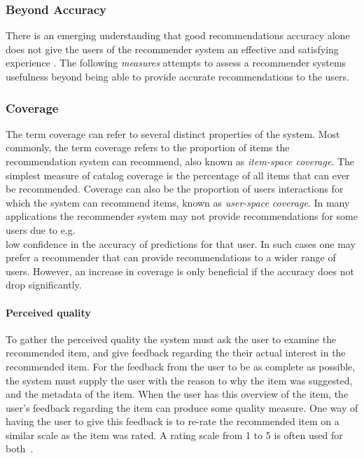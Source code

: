 \subsubsection{Beyond Accuracy}
There is an emerging understanding that good recommendations accuracy alone does not give the users of the recommender system an effective and satisfying experience \cite{Herlocker2004}. The following \emph{measures} attempts to assess a recommender systems usefulness beyond being able to provide accurate recommendations to the users.

\subsubsection{Coverage}
The term coverage can refer to several distinct properties of the system. Most
commonly, the term coverage refers to the proportion of items the
recommendation system can recommend, also known as \emph{item-space coverage}.
The simplest measure of catalog coverage is the percentage of all items that
can ever be recommended. Coverage can also be the proportion of users
interactions for which the system can recommend items, known as
\emph{user-space coverage}. In many applications the recommender system may not
provide recommendations for some users due to e.g.\\ low confidence in the
accuracy of predictions for that user. In such cases one may prefer a
recommender that can provide recommendations to a wider range of users. However, an increase in coverage is only beneficial if the accuracy does not drop significantly.

\paragraph{Perceived quality}
To gather the perceived quality the system must ask the user to examine the recommended item, and give feedback regarding the their actual interest in the recommended item.
For the feedback from the user to be as complete as possible, the system must supply the user with the reason to why the item was suggested, and the metadata of the item.
When the user has this overview of the item, the user's feedback regarding the item can produce some quality measure.
One  way of having the user to give this feedback is to re-rate the recommended item on a similar scale as the item was rated.
A rating scale from 1 to 5 is often used for both~\cite{Schafer:1999:RSE:336992.337035}.

